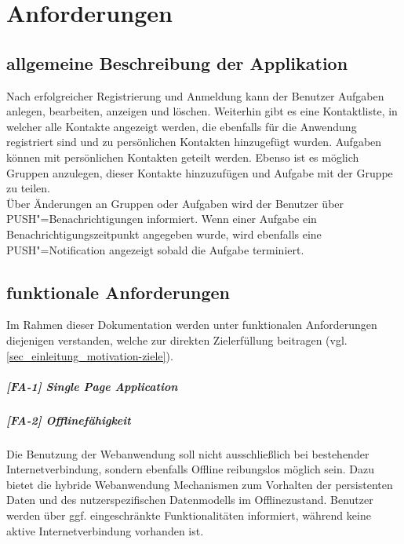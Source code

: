 \chapter{Anforderungen}
\label{chp_anforderungen}

\section{allgemeine Beschreibung der Applikation}
\label{sec_anfroderungen_allgemeine-beschreibung}

Nach erfolgreicher Registrierung und Anmeldung kann der Benutzer Aufgaben anlegen, bearbeiten, anzeigen und löschen. Weiterhin gibt es eine Kontaktliste, in welcher alle Kontakte angezeigt werden, die ebenfalls für die Anwendung registriert sind und zu persönlichen Kontakten hinzugefügt wurden. Aufgaben können mit persönlichen Kontakten geteilt werden. Ebenso ist es möglich Gruppen anzulegen, dieser Kontakte hinzuzufügen und Aufgabe mit der Gruppe zu teilen. \\

Über Änderungen an Gruppen oder Aufgaben wird der Benutzer über PUSH"=Benachrichtigungen informiert. Wenn einer Aufgabe ein Benachrichtigungszeitpunkt angegeben wurde, wird ebenfalls eine PUSH"=Notification angezeigt sobald die Aufgabe terminiert.

\newpage
\section{funktionale Anforderungen}
\label{sec_anforderungen_funktionale-anforderungen}

Im Rahmen dieser Dokumentation werden unter funktionalen Anforderungen diejenigen verstanden, welche zur direkten Zielerfüllung beitragen (vgl. \ref{sec_einleitung_motivation-ziele}).


\paragraph{[FA-1] Single Page Application}\label{fa-1}
\paragraph{[FA-2] Offlinefähigkeit}\label{fa-2} Die Benutzung der Webanwendung soll nicht ausschließlich bei bestehender Internetverbindung, sondern ebenfalls Offline reibungslos möglich sein. Dazu bietet die hybride Webanwendung Mechanismen zum Vorhalten der persistenten Daten und des nutzerspezifischen Datenmodells im Offlinezustand. Benutzer werden über ggf. eingeschränkte Funktionalitäten informiert, während keine aktive Internetverbindung vorhanden ist.


